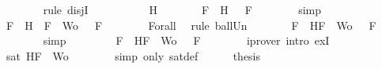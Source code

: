 \begin{isabellebody}
\ \ \ \ \ \ \isamarkupfalse%
\ {\isacharparenleft}rule\ disjI{}{\isacharparenright}\isanewline
\ \ \isamarkupfalse%
\isanewline
\ \ \ \ \isamarkupfalse%
\ {\isachardoublequoteopen}{\isasymA}\ {\isasymTurnstile}\ H{\isachardoublequoteclose}\isanewline
\ \ \ \ \isamarkupfalse%
\ \isamarkupfalse%
\ {\isachardoublequoteopen}{\isasymforall}F\ {\isasymin}\ {\isacharbraceleft}H{\isacharbraceright}{\isachardot}\ {\isasymA}\ {\isasymTurnstile}\ F{\isachardoublequoteclose}\isanewline
\ \ \ \ \ \ \isamarkupfalse%
\ simp\isanewline
\ \ \ \ \isamarkupfalse%
\ \isamarkupfalse%
\ {\isachardoublequoteopen}{\isasymforall}F\ {\isasymin}\ {\isacharparenleft}{\isacharbraceleft}H{\isacharbraceright}\ {\isasymunion}\ {\isacharparenleft}{\isacharbraceleft}F{\isacharbraceright}\ {\isasymunion}\ Wo{\isacharparenright}{\isacharparenright}{\isachardot}\ {\isasymA}\ {\isasymTurnstile}\ F{\isachardoublequoteclose}\isanewline
\ \ \ \ \ \ \isamarkupfalse%
\ Forall{}\ \isamarkupfalse%
\ {\isacharparenleft}rule\ ball{\isacharunderscore}Un{\isacharparenright}\isanewline
\ \ \ \ \isamarkupfalse%
\ \isamarkupfalse%
\ {\isachardoublequoteopen}{\isasymforall}F\ {\isasymin}\ {\isacharbraceleft}H{\isacharcomma}F{\isacharbraceright}\ {\isasymunion}\ Wo{\isachardot}\ {\isasymA}\ {\isasymTurnstile}\ F{\isachardoublequoteclose}\isanewline
\ \ \ \ \ \ \isamarkupfalse%
\ simp\isanewline
\ \ \ \ \isamarkupfalse%
\ \isamarkupfalse%
\ {\isachardoublequoteopen}{\isasymexists}{\isasymA}{\isachardot}\ {\isasymforall}F\ {\isasymin}\ {\isacharparenleft}{\isacharbraceleft}H{\isacharcomma}F{\isacharbraceright}\ {\isasymunion}\ Wo{\isacharparenright}{\isachardot}\ {\isasymA}\ {\isasymTurnstile}\ F{\isachardoublequoteclose}\isanewline
\ \ \ \ \ \ \isamarkupfalse%
\ {\isacharparenleft}iprover\ intro{\isacharcolon}\ exI{\isacharparenright}\isanewline
\ \ \ \ \isamarkupfalse%
\ \isamarkupfalse%
\ {\isachardoublequoteopen}sat\ {\isacharparenleft}{\isacharbraceleft}H{\isacharcomma}F{\isacharbraceright}\ {\isasymunion}\ Wo{\isacharparenright}{\isachardoublequoteclose}\isanewline
\ \ \ \ \ \ \isamarkupfalse%
\ {\isacharparenleft}simp\ only{\isacharcolon}\ sat{\isacharunderscore}def{\isacharparenright}\isanewline
\ \ \ \ \isamarkupfalse%
\ {\isacharquery}thesis\isanewline

\end{isabellebody}
